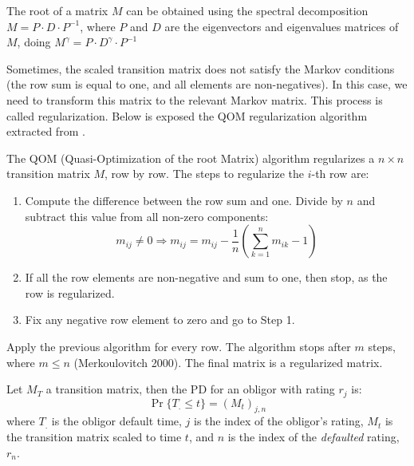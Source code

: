\documentclass[11pt,fleqn]{book} %
\begin{document}
The root of a matrix $M$ can be obtained using the spectral decomposition
$M = P \cdot D \cdot P^{-1}$, where $P$ and $D$ are the eigenvectors and
eigenvalues matrices of $M$, doing $M^{\gamma} = P \cdot D^{\gamma} \cdot P^{-1}$

Sometimes, the scaled transition matrix does not satisfy the Markov conditions
(the row sum is equal to one, and all elements are non-negatives). In this case, 
we need to transform this matrix to the relevant Markov matrix. This process is 
called regularization. Below is exposed the QOM regularization algorithm 
extracted from \cite{kreinin:2001}.

\begin{algorithm}
	The QOM (Quasi-Optimization of the root Matrix) algorithm regularizes a 
	$n {\times} n$ transition matrix $M$, row by row. The steps to 
	regularize the $i$-th row are:
	\begin{enumerate}
		\item Compute the difference between the row sum and one. 
		Divide by $n$ and subtract this value from all non-zero components:
		\begin{displaymath}
			m_{ij} \ne 0 
			\Longrightarrow 
			m_{ij} = m_{ij} - \frac{1}{n} \left( \sum_{k=1}^{n} m_{ik} - 1\right)
		\end{displaymath}
		\item If all the row elements are non-negative and sum to one, 
		then stop, as the row is regularized.
		\item Fix any negative row element to zero and go to Step 1.
	\end{enumerate}
	
	Apply the previous algorithm for every row. The algorithm stops after $m$ 
	steps, where $m \le n$ (Merkoulovitch 2000). The final matrix is a regularized
	matrix. 
\end{algorithm}

\begin{proposition}
	\label{prop:pdftm}
	Let $M_T$ a transition matrix, then the PD for an obligor with 
	rating $r_j$ is:
	\begin{displaymath}
		\Pr\{T_. \le t\} = \left( M_t \right)_{j, n}
	\end{displaymath}
	where $T_.$ is the obligor default time, $j$ is the index of the obligor's
	rating, $M_t$ is the transition matrix scaled to time $t$, and $n$ is the 
	index of the \emph{defaulted} rating, $r_n$.
\end{proposition}
\end{document}
